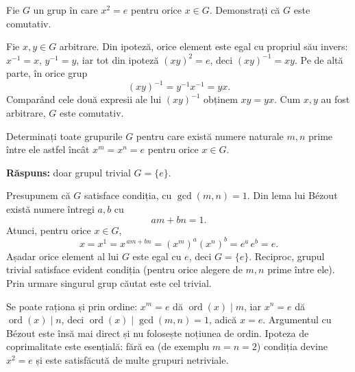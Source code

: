 
\setcounter{cat}{1}\setcounter{problemaX}{0}

\begin{problema}[Clasică]
Fie $G$ un grup în care $x^{2}=e$ pentru orice $x \in G$. Demonstrați
că $G$ este comutativ.
\end{problema}

\begin{solutie}
Fie $x,y \in G$ arbitrare. Din ipoteză, orice element este egal cu
propriul său invers: $x^{-1}=x$, $y^{-1}=y$, iar tot din ipoteză
$(xy)^{2}=e$, deci $(xy)^{-1}=xy$. Pe de altă parte, în orice grup
\[
  (xy)^{-1} = y^{-1}x^{-1} = yx.
\]
Comparând cele două expresii ale lui $(xy)^{-1}$ obținem
$xy=yx$. Cum $x,y$ au fost arbitrare, $G$ este comutativ.
\end{solutie}

\begin{problema}
Determinați toate grupurile $G$ pentru care există numere naturale
$m,n$ prime între ele astfel încât $x^{m}=x^{n}=e$ pentru orice
$x \in G$.
\end{problema}

\noindent\textbf{Răspuns:} doar grupul trivial $G=\{e\}$.

\begin{solutie}
Presupunem că $G$ satisface condiția, cu $\gcd(m,n)=1$. Din lema lui
Bézout există numere întregi $a,b$ cu
\[
  am+bn = 1 .
\]
Atunci, pentru orice $x \in G$,
\[
  x = x^{1} = x^{\,am+bn} = \left(x^{m}\right)^{a}\left(x^{n}\right)^{b}
    = e^{a}\,e^{b} = e .
\]
Așadar orice element al lui $G$ este egal cu $e$, deci $G=\{e\}$.
Reciproc, grupul trivial satisface evident condiția (pentru orice
alegere de $m,n$ prime între ele). Prin urmare singurul grup căutat
este cel trivial.
\end{solutie}

\begin{obs}
Se poate raționa și prin ordine: $x^{m}=e$ dă $\operatorname{ord}(x)\mid m$,
iar $x^{n}=e$ dă $\operatorname{ord}(x)\mid n$, deci
$\operatorname{ord}(x)\mid \gcd(m,n)=1$, adică $x=e$. Argumentul cu
Bézout este însă mai direct și nu folosește noțiunea
de ordin. Ipoteza de coprimalitate este esențială: fără ea
(de exemplu $m=n=2$) condiția devine $x^{2}=e$ și este satisfăcută
de multe grupuri netriviale.
\end{obs}

